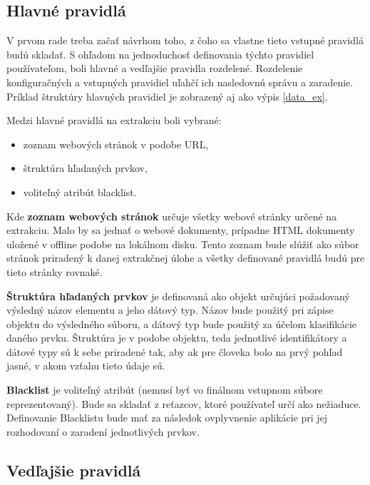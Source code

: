 \bigskip

\subsection{Hlavné pravidlá}

V prvom rade treba začať návrhom toho, z čoho sa vlastne tieto vstupné pravidlá budú skladať. S ohľadom na jednoduchosť definovania týchto pravidiel používateľom, boli hlavné a vedľajšie pravidla rozdelené. Rozdelenie konfiguračných a vstupných pravidiel uľahčí ich nasledovnú správu a zaradenie. Príklad štruktúry hlavných pravidiel je zobrazený aj ako výpis \ref{data_ex}.

Medzi hlavné pravidlá na extrakciu boli vybrané:
\begin{itemize}
    \item zoznam webových stránok v podobe URL,
    \item štruktúra hľadaných prvkov,
    \item voliteľný atribút blacklist.
\end{itemize}

\bigskip

Kde \textbf{zoznam webových stránok} určuje všetky webové stránky určené na extrakciu. Malo by sa jednať o webové dokumenty, prípadne HTML dokumenty uložené v offline podobe na lokálnom disku. Tento zoznam bude slúžiť ako súbor stránok priradený k danej extrakčnej úlohe a všetky definované pravidlá budú pre tieto stránky rovnaké. 

\bigskip

\textbf{Štruktúra hľadaných prvkov} je definovaná ako objekt určujúci požadovaný výsledný názov elementu a jeho  dátový typ. Názov bude použitý pri zápise objektu do výsledného súboru, a dátový typ bude použitý za účelom klasifikácie daného prvku. Štruktúra je v podobe objektu, teda jednotlivé identifikátory a dátové typy sú k sebe priradené tak, aby ak pre človeka bolo na prvý pohľad jasné, v akom vzťahu tieto údaje sú.

\bigskip

\textbf{Blacklist} je voliteľný atribút (nemusí byť vo finálnom vstupnom súbore reprezentovaný). Bude sa skladať z reťazcov, ktoré používateľ určí ako nežiaduce. Definovanie Blacklistu bude mať za následok ovplyvnenie aplikácie pri jej rozhodovaní o zaradení jednotlivých prvkov.


\subsection{Vedľajšie pravidlá}

